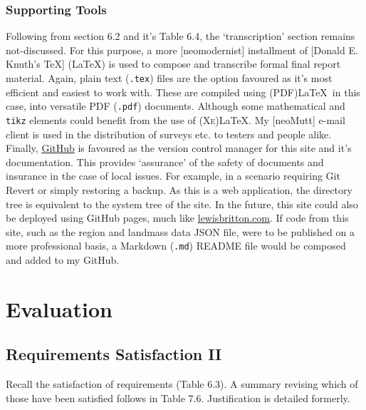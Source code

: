 \documentclass[11pt, english]{article}
\begin{document}
		\subsubsection{Supporting Tools}

	Following from section 6.2 and it's Table 6.4, the `transcription' section remains not-discussed. For this purpose, a more [neomodernist] installment of [Donald E. Knuth's {\TeX}] ({\LaTeX}) is used to compose and transcribe formal final report material. Again, plain text (\texttt{.tex}) files are the option favoured as it's most efficient and easiest to work with. These are compiled using (PDF){\LaTeX}\ in this case, into versatile PDF (\texttt{.pdf}) documents. Although some mathematical and \texttt{tikz} elements could benefit from the use of (\textsc{Xe}){\LaTeX}. My [neoMutt] e-mail client is used in the distribution of surveys etc. to testers and people alike.\\

	Finally, \href{https://github.com/FedeRog1977}{GitHub} is favoured as the version control manager for this site and it's documentation. This provides `assurance' of the safety of documents and insurance in the case of local issues. For example, in a scenario requiring Git Revert or simply restoring a backup. As this is a web application, the directory tree is equivalent to the system tree of the site. In the future, this site could also be deployed using GitHub pages, much like \href{http://lewisbritton.com/}{lewisbritton.com}. If code from this site, such as the region and landmass data JSON file, were to be published on a more professional basis, a Markdown (\texttt{.md}) README file would be composed and added to my GitHub.

\newpage

\section{Evaluation}\label{ch7}

	\subsection{Requirements Satisfaction II}

	Recall the satisfaction of requirements (Table 6.3). A summary revising which of those have been satisfied follows in Table 7.6. Justification is detailed formerly.
\end{document}
